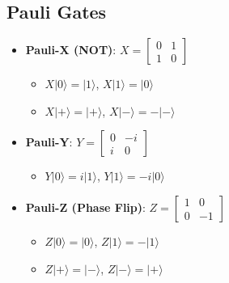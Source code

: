 \begin{multicols}{3}
    \section*{Pauli Gates}
    \begin{itemize}[leftmargin=*,nosep,topsep=0pt]
      \item \textbf{Pauli-X (NOT)}: $X = \begin{bmatrix} 0 & 1 \\ 1 & 0 \end{bmatrix}$
        \begin{itemize}[nosep]
          \item $X|0\rangle = |1\rangle$, $X|1\rangle = |0\rangle$
          \item $X|+\rangle = |+\rangle$, $X|-\rangle = -|-\rangle$
        \end{itemize}
      \item \textbf{Pauli-Y}: $Y = \begin{bmatrix} 0 & -i \\ i & 0 \end{bmatrix}$
        \begin{itemize}[nosep]
          \item $Y|0\rangle = i|1\rangle$, $Y|1\rangle = -i|0\rangle$
        \end{itemize}
      \item \textbf{Pauli-Z (Phase Flip)}: $Z = \begin{bmatrix} 1 & 0 \\ 0 & -1 \end{bmatrix}$
        \begin{itemize}[nosep]
          \item $Z|0\rangle = |0\rangle$, $Z|1\rangle = -|1\rangle$
          \item $Z|+\rangle = |-\rangle$, $Z|-\rangle = |+\rangle$
        \end{itemize}
    \end{itemize}


\end{multicols}
